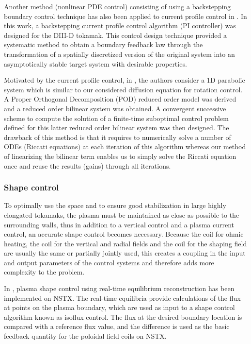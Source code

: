 \documentclass[12pt,lot, lof]{puthesis}
\begin{document}
Another method (nonlinear PDE control) consisting of using a backstepping boundary control technique has also been applied to current profile control in \cite{Boyer14}. In this work, a backstepping current profile control algorithm (PI controller) was designed for the DIII-D tokamak. This control design technique provided a systematic method to obtain a boundary feedback law through the transformation of a spatially discretized version of the original system into an asymptotically stable target system with desirable properties. 

Motivated by the current profile control, in \cite{Xu11}, the authors consider a 1D parabolic system which is similar to our considered diffusion equation for rotation control. A Proper Orthogonal Decomposition (POD) reduced order model was derived and a reduced order bilinear system was obtained. A convergent successive scheme to compute the solution of a finite-time suboptimal control problem defined for this latter reduced order bilinear system was then designed.
The drawback of this method is that it requires to numerically solve a number of ODEs (Riccati equations) at each iteration of this algorithm whereas our method of linearizing the bilinear term enables us to simply solve the Riccati equation once and reuse the results (gains) through all iterations.


 \subsubsection{{Shape control}} 
To optimally use the space and to ensure good stabilization in large highly elongated tokamaks, the plasma must be maintained as close as possible to the surrounding walls, thus in addition to a vertical control and a plasma current control, an accurate shape control becomes necessary. Because the coil for ohmic heating, the coil for the vertical and radial fields and the coil for the shaping field are usually the same or partially jointly used, this creates a coupling in the input and output parameters of the control systems and therefore adds more complexity to the problem.

In \cite{Gates05}, plasma shape control using real-time equilibrium reconstruction has been implemented on NSTX. The real-time equilibria provide calculations of the flux at points on the plasma boundary, which are used as input to a shape control algorithm known as isoflux control. The flux at the desired boundary location is compared with a reference flux value, and the difference is used as the basic feedback quantity for the poloidal field coils on NSTX.
\end{document}
